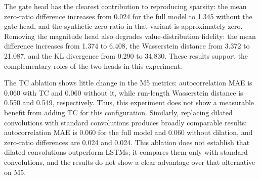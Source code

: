 \documentclass[make,article,submit,moreauthors]{Definitions/mdpi}
\begin{document}
The gate head has the clearest contribution to reproducing sparsity: the mean zero-ratio difference increases from 0.024 for the full model to 1.345 without the gate head, and the synthetic zero ratio in that variant is approximately zero. Removing the magnitude head also degrades value-distribution fidelity: the mean difference increases from 1.374 to 6.408, the Wasserstein distance from 3.372 to 21.087, and the KL divergence from 0.290 to 34.830. These results support the complementary roles of the two heads in this experiment.

The TC ablation shows little change in the M5 metrics: autocorrelation MAE is 0.060 with TC and 0.060 without it, while run-length Wasserstein distance is 0.550 and 0.549, respectively. Thus, this experiment does not show a measurable benefit from adding TC for this configuration. Similarly, replacing dilated convolutions with standard convolutions produces broadly comparable results: autocorrelation MAE is 0.060 for the full model and 0.060 without dilation, and zero-ratio differences are 0.024 and 0.024. This ablation does not establish that dilated convolutions outperform LSTMs; it compares them only with standard convolutions, and the results do not show a clear advantage over that alternative on M5.
\end{document}
